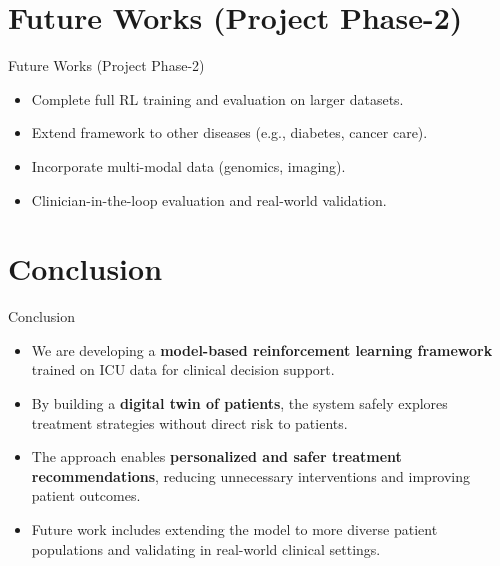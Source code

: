 \documentclass[11pt]{beamer}
\begin{document}
\section{Future Works (Project Phase-2)}
\begin{frame}{Future Works (Project Phase-2)}
\begin{itemize}
    \item Complete full RL training and evaluation on larger datasets.
    \item Extend framework to other diseases (e.g., diabetes, cancer care).  
    \item Incorporate multi-modal data (genomics, imaging).  
    \item Clinician-in-the-loop evaluation and real-world validation.
\end{itemize}
\end{frame}

\section{Conclusion}
\begin{frame}{Conclusion}
\begin{itemize}
    \item We are developing a \textbf{model-based reinforcement learning framework} trained on ICU data for clinical decision support.  
    \vspace{6pt}
    \item By building a \textbf{digital twin of patients}, the system safely explores treatment strategies without direct risk to patients.  
    \vspace{6pt}
    \item The approach enables \textbf{personalized and safer treatment recommendations}, reducing unnecessary interventions and improving patient outcomes.  
    \vspace{6pt}
    \item Future work includes extending the model to more diverse patient populations and validating in real-world clinical settings.  
\end{itemize}
\end{frame}

\end{document}

